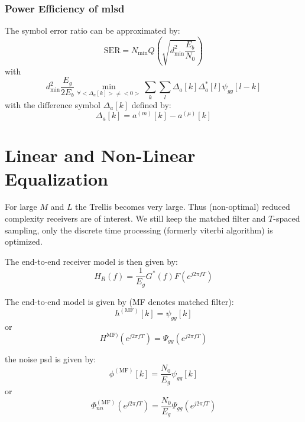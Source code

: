 \subsubsection{Power Efficiency of \acl{mlsd}}
The symbol error ratio can be approximated by:
\begin{equation}
    \text{SER} = N_\text{min} Q\left(\sqrt{d_\text{min}^2 \frac{E_b}{N_0}}\right)
\end{equation}
with
\begin{equation}
    d_\text{min}^2 \frac{E_g}{2 E_b} \min_{\forall <\Delta_a[k]> \neq <0>}
        \sum_k \sum_l \Delta_a[k] \Delta_a^*[l] \psi_{gg}[l-k]
\end{equation}
with the difference symbol $\Delta_a[k]$ defined by:
\begin{equation}
    \Delta_a[k] = a^{(m)}[k] - a^{(\mu)}[k]
\end{equation}

\section{Linear and Non-Linear Equalization}
For large $M$ and $L$ the Trellis becomes very large. Thus (non-optimal) reduced complexity
receivers are of interest. We still keep the matched filter and $T$-spaced sampling, only
the discrete time processing (formerly viterbi algorithm) is optimized.

The end-to-end receiver model is then given by:
\begin{equation}
    H_R(f) = \frac{1}{E_g} G^*(f) F\left(e^{j 2 \pi f T}\right)
\end{equation}

The end-to-end model is given by (MF denotes matched filter):
\begin{equation}
    h^{(\text{MF})}[k] = \psi_{gg}[k]
\end{equation}
or
\begin{equation}
    H^{\text{MF})}\left(e^{j 2 \pi f T}\right) = \Psi_{gg}\left(e^{j 2 \pi f T}\right)
\end{equation}

the noise \ac{psd} is given by:
\begin{equation}
    \phi^{(\text{MF})}[k] = \frac{N_0}{E_g} \psi_{gg}[k]
\end{equation}
or
\begin{equation}
    \Phi_{nn}^{(\text{MF})}\left(e^{j 2 \pi f T}\right) = \frac{N_0}{E_g}
        \Psi_{gg}\left(e^{j 2 \pi f T}\right)
\end{equation}

